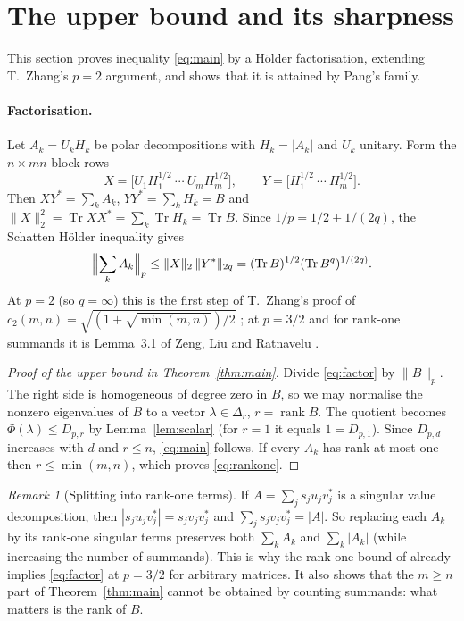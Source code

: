 \documentclass[11pt,a4paper]{article}
\numberwithin{equation}{section}
\theoremstyle{definition}
\theoremstyle{remark}
\newtheorem{remark}[theorem]{Remark}
\DeclareMathOperator{\Tr}{Tr}
\DeclareMathOperator{\rank}{rank}
\begin{document}
\section{The upper bound and its sharpness}\label{sec:upper}

This section proves inequality \eqref{eq:main} by a Hölder
factorisation, extending T.~Zhang's \(p=2\) argument, and shows that it
is attained by Pang's family.

\paragraph{Factorisation.}
Let \(A_k=U_kH_k\) be polar decompositions with \(H_k=|A_k|\) and
\(U_k\) unitary. Form the \(n\times mn\) block rows
\[
 X=\bigl[U_1H_1^{1/2}\ \cdots\ U_mH_m^{1/2}\bigr],
 \qquad
 Y=\bigl[H_1^{1/2}\ \cdots\ H_m^{1/2}\bigr].
\]
Then \(XY^*=\sum_kA_k\), \(YY^*=\sum_kH_k=B\) and
\(\|X\|_2^2=\Tr XX^*=\sum_k\Tr H_k=\Tr B\). Since \(1/p=1/2+1/(2q)\),
the Schatten Hölder inequality gives
\begin{equation}\label{eq:factor}
 \Bigl\|\sum_kA_k\Bigr\|_p\le\|X\|_2\,\|Y^*\|_{2q}
 =(\Tr B)^{1/2}(\Tr B^q)^{1/(2q)}.
\end{equation}
At \(p=2\) (so \(q=\infty\)) this is the first step of T.~Zhang's proof
of \(c_2(m,n)=\sqrt{(1+\sqrt{\min(m,n)})/2}\) \cite[Theorem 6.2]{Zhang};
at \(p=3/2\) and for rank-one summands it is Lemma~3.1 of Zeng, Liu and
Ratnavelu \cite{ZengExact}.

\begin{proof}[Proof of the upper bound in Theorem~\ref{thm:main}]
Divide \eqref{eq:factor} by \(\|B\|_p\). The right side is homogeneous
of degree zero in \(B\), so we may normalise the nonzero eigenvalues of
\(B\) to a vector \(\lambda\in\Delta_r\), \(r=\rank B\). The quotient
becomes \(\Phi(\lambda)\le D_{p,r}\) by Lemma~\ref{lem:scalar} (for
\(r=1\) it equals \(1=D_{p,1}\)). Since \(D_{p,d}\) increases with \(d\)
and \(r\le n\), \eqref{eq:main} follows. If every \(A_k\) has rank at
most one then \(r\le\min(m,n)\), which proves \eqref{eq:rankone}.
\end{proof}

\begin{remark}[Splitting into rank-one terms]\label{rem:splitting}
If \(A=\sum_js_ju_jv_j^*\) is a singular value decomposition, then
\(|s_ju_jv_j^*|=s_jv_jv_j^*\) and \(\sum_js_jv_jv_j^*=|A|\). So replacing
each \(A_k\) by its rank-one singular terms preserves both \(\sum_kA_k\)
and \(\sum_k|A_k|\) (while increasing the number of summands). This is why
the rank-one bound of \cite[Lemma 3.1]{ZengExact} already implies
\eqref{eq:factor} at \(p=3/2\) for arbitrary matrices. It also shows that
the \(m\ge n\) part of Theorem~\ref{thm:main} cannot be obtained by
counting summands: what matters is the rank of \(B\).
\end{remark}
\end{document}
